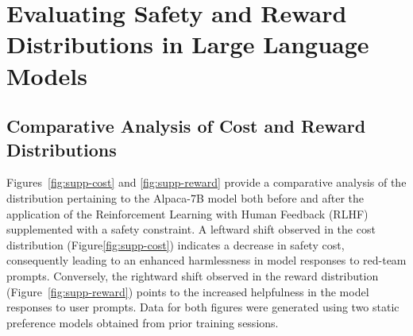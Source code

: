 \section{Evaluating Safety and Reward Distributions in Large Language Models}

\subsection{Comparative Analysis of Cost and Reward Distributions}
Figures~\ref{fig:supp-cost} and \ref{fig:supp-reward} provide a comparative analysis of the distribution pertaining to the Alpaca-7B model both before and after the application of the Reinforcement Learning with Human Feedback (RLHF) supplemented with a safety constraint. A leftward shift observed in the cost distribution (Figure\ref{fig:supp-cost}) indicates a decrease in safety cost, consequently leading to an enhanced harmlessness in model responses to red-team prompts. Conversely, the rightward shift observed in the reward distribution (Figure~\ref{fig:supp-reward}) points to the increased helpfulness in the model responses to user prompts. Data for both figures were generated using two static preference models obtained from prior training sessions.


